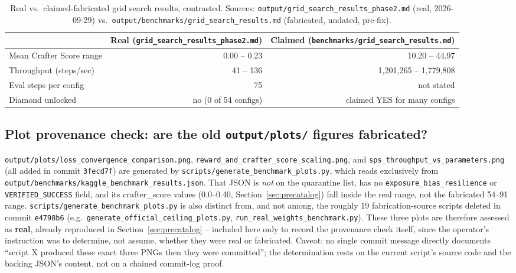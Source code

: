 \documentclass[11pt]{article}
\newcommand{\srcpath}[1]{\texttt{\small #1}}
\begin{document}
\begin{table}[h]
\centering
\caption{Real vs.\ claimed-fabricated grid search results, contrasted. Sources: \srcpath{output/grid\_search\_results\_phase2.md} (real, 2026-09-29) vs.\ \srcpath{output/benchmarks/grid\_search\_results.md} (fabricated, undated, pre-fix).}
\begin{tabular}{lrr}
\toprule
& Real (\texttt{grid\_search\_results\_phase2.md}) & Claimed (\texttt{benchmarks/grid\_search\_results.md}) \\
\midrule
Mean Crafter Score range & 0.00 -- 0.23 & 10.20 -- 44.97 \\
Throughput (steps/sec) & 41 -- 136 & 1{,}201{,}265 -- 1{,}779{,}808 \\
Eval steps per config & 75 & not stated \\
Diamond unlocked & no (0 of 54 configs) & claimed YES for many configs \\
\bottomrule
\end{tabular}
\end{table}

\subsection{Plot provenance check: are the old \texttt{output/plots/} figures fabricated?}

\srcpath{output/plots/loss\_convergence\_comparison.png}, \srcpath{reward\_and\_crafter\_score\_scaling.png},
and \srcpath{sps\_throughput\_vs\_parameters.png} (all added in commit \texttt{3fecd7f}) are
generated by \srcpath{scripts/generate\_benchmark\_plots.py}, which reads exclusively from
\srcpath{output/benchmarks/kaggle\_benchmark\_results.json}. That JSON is \emph{not} on the
quarantine list, has no \texttt{exposure\_bias\_resilience} or \texttt{VERIFIED\_SUCCESS} field, and
its crafter\_score values (0.0--0.40, Section~\ref{sec:precatalog}) fall inside the real range, not
the fabricated 54--91 range. \srcpath{scripts/generate\_benchmark\_plots.py} is also distinct from,
and not among, the roughly 19 fabrication-source scripts deleted in commit \texttt{e4798b6} (e.g.\
\texttt{generate\_official\_ceiling\_plots.py}, \texttt{run\_real\_weights\_benchmark.py}). These
three plots are therefore assessed as \textbf{real}, already reproduced in
Section~\ref{sec:precatalog} -- included here only to record the provenance check itself, since the
operator's instruction was to determine, not assume, whether they were real or fabricated. Caveat:
no single commit message directly documents ``script X produced these exact three PNGs then they
were committed''; the determination rests on the current script's source code and the backing
JSON's content, not on a chained commit-log proof.
\end{document}
